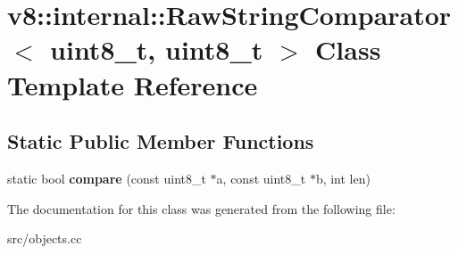 \hypertarget{classv8_1_1internal_1_1_raw_string_comparator_3_01uint8__t_00_01uint8__t_01_4}{}\section{v8\+:\+:internal\+:\+:Raw\+String\+Comparator$<$ uint8\+\_\+t, uint8\+\_\+t $>$ Class Template Reference}
\label{classv8_1_1internal_1_1_raw_string_comparator_3_01uint8__t_00_01uint8__t_01_4}
\subsection*{Static Public Member Functions}
\begin{DoxyCompactItemize}
\item 
\hypertarget{classv8_1_1internal_1_1_raw_string_comparator_3_01uint8__t_00_01uint8__t_01_4_a1229fa356a713a56bcf53b9a90d0a58c}{}static bool {\bfseries compare} (const uint8\+\_\+t $\ast$a, const uint8\+\_\+t $\ast$b, int len)\label{classv8_1_1internal_1_1_raw_string_comparator_3_01uint8__t_00_01uint8__t_01_4_a1229fa356a713a56bcf53b9a90d0a58c}

\end{DoxyCompactItemize}


The documentation for this class was generated from the following file\+:\begin{DoxyCompactItemize}
\item 
src/objects.\+cc\end{DoxyCompactItemize}
